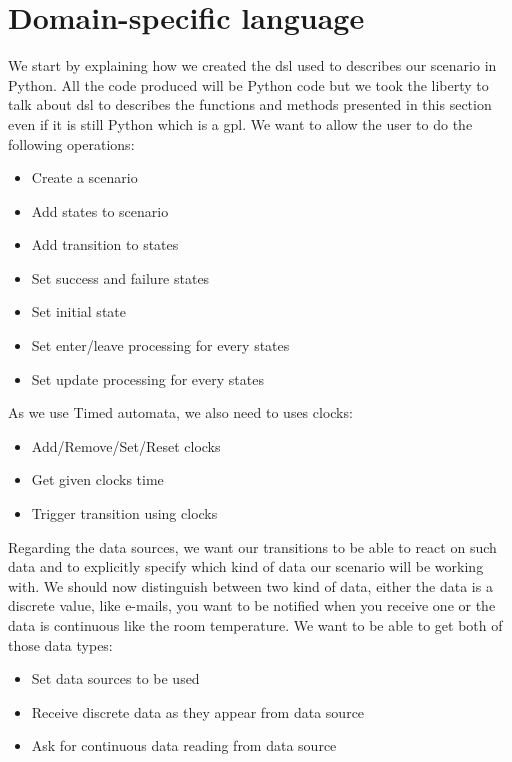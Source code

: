 \documentclass[12pt]{article}
\theoremstyle{definition}
\theoremstyle{definition}
\theoremstyle{remark}
\begin{document}
\clearpage




\section{Domain-specific language}


We start by explaining how we created the \gls{dsl} used to describes our scenario in Python. All the code produced will be Python code but we took the liberty to talk about \gls{dsl} to describes the functions and methods presented in this section even if it is still Python which is a \gls{gpl}. We want to allow the user to do the following operations:

\begin{itemize}
\item Create a scenario
\item Add states to scenario
\item Add transition to states
\item Set success and failure states
\item Set initial state
\item Set enter/leave processing for every states
\item Set update processing for every states
\end{itemize}

As we use Timed automata, we also need to uses clocks:

\begin{itemize}
\item Add/Remove/Set/Reset clocks
\item Get given clocks time
\item Trigger transition using clocks
\end{itemize}

Regarding the data sources, we want our transitions to be able to react on such data and to explicitly specify which kind of data our scenario will be working with. We should now distinguish between two kind of data, either the data is a discrete value, like e-mails, you want to be notified when you receive one or the data is continuous like the room temperature. We want to be able to get both of those data types:

\begin{itemize}
\item Set data sources to be used
\item Receive discrete data as they appear from data source
\item Ask for continuous data reading from data source
\end{itemize}
\end{document}
